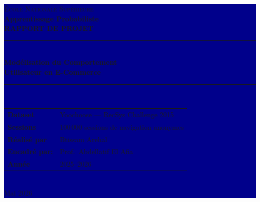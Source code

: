 \documentclass[11pt,a4paper]{article}
\begin{document}

\begin{titlepage}
\colorbox{DarkBlue}{\parbox{\textwidth}{%
\vspace{1.4cm}
\begin{center}
{\color{MedGray}\small\textsc{École Nationale Supérieure}}\\[0.3cm]
{\color{LightBlue}\small\textbf{Apprentissage Probabiliste}}\\[1.0cm]

{\color{white}\fontsize{14}{18}\selectfont\bfseries RAPPORT DE PROJET}\\[0.4cm]
\textcolor{MedBlue}{\rule{0.65\textwidth}{1.5pt}}\\[0.6cm]

{\color{white}\fontsize{22}{30}\selectfont\bfseries Modélisation du Comportement}\\[0.2cm]
{\color{white}\fontsize{22}{30}\selectfont\bfseries Utilisateur en E-Commerce}\\[0.5cm]


\textcolor{MedBlue}{\rule{0.65\textwidth}{0.5pt}}\\[0.8cm]

\colorbox{white!8!DarkBlue}{\parbox{0.85\textwidth}{
  \color{white}
  \begin{tabular}{@{\hspace{10pt}}ll@{}}
    \textbf{Dataset}      & Yoochoose --- RecSys Challenge 2015 \\[4pt]
    \textbf{Sessions}     & 100\,000 sessions de navigation anonymes \\[4pt]
   
    \textbf{Réalisé par}        &  Btissam Arehal \\[4pt]
    
    \textbf{Encadré par:}        & Prof.\ Abdellatif El Afia \\[4pt]
    \textbf{Année}        & 2025--2026 \\
  \end{tabular}
}}\\[1.2cm]
{\color{MedGray}\small Mai 2026}
\end{center}
\vspace{0.8cm}
}}

\vfill
\begin{center}
\colorbox{LightBlue}{\parbox{0.92\textwidth}{
\centering
\vspace{4pt}

\vspace{4pt}
}}
\end{center}
\end{titlepage}
\end{document}
